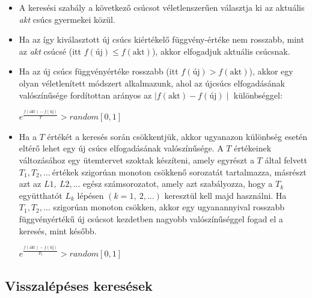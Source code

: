 \documentclass[12pt,margin=0px]{article}
\begin{document}
\begin{itemize}
\begin{itemize}
            \item A keresési szabály a következő csúcsot véletlenszerűen választja ki az aktuális \emph{akt} csúcs gyermekei közül.
            \item Ha az így kiválasztott új csúcs kiértékelő függvény-értéke nem rosszabb, mint az \emph{akt} csúcsé (itt $f(\text{új}) \leq f(\text{akt})$), akkor elfogadjuk aktuális csúcsnak.
            \item Ha az új csúcs függvényértéke rosszabb (itt $f(\text{új}) > f(\text{akt})$), akkor egy olyan véletlenített módszert alkalmazunk, ahol az újcsúcs elfogadásának valószínűsége fordítottan arányos az $\mid f(\text{akt}) - f(\text{új}) \mid$ különbséggel:
            \begin{center}
                $e^{\frac{f(\text{akt}) - f(\text{új})}{T}} > random[0,1]$
            \end{center}
            \item Ha a $T$ értékét a keresés során csökkentjük, akkor ugyanazon különbség esetén eltérő lehet egy új csúcs elfogadásának valószínűsége. A $T$ értékeinek változásához egy ütemtervet szoktak készíteni, amely egyrészt a $T$ által felvett $T_1, T_2, \ldots\ $értékek szigorúan monoton csökkenő sorozatát tartalmazza, másrészt azt az $L1,\ L2, \ldots $ egész számsorozatot, amely azt szabályozza, hogy a $T_k$ együtthatót $L_k$ lépésen $(k=1,\ 2, \ldots)$ keresztül kell majd használni. Ha $T_1,T_2, ...$ szigorúan monoton csökken, akkor egy ugyanannyival rosszabb függvényértékű új csúcsot kezdetben nagyobb valószínűséggel fogad el a keresés, mint később.
            \begin{center}
                $e^{\frac{f(\text{akt}) - f(\text{új})}{T_k}} > random[0,1]$
            \end{center}
        \end{itemize}
	\end{itemize}
	
	\subsection*{Visszalépéses keresések}
	
\end{document}
